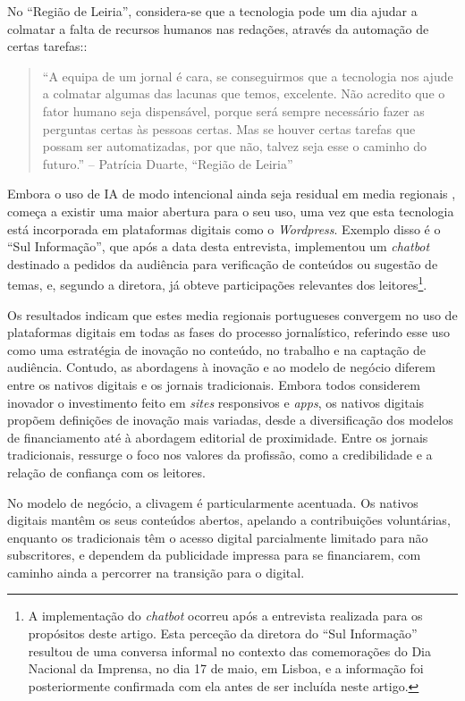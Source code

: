 \documentclass[portuguese]{textolivre}
\begin{document}
No ``Região de Leiria'', considera-se que a tecnologia pode um dia
ajudar a colmatar a falta de recursos humanos nas redações, através da
automação de certas tarefas::

\begin{quote}
``A equipa de um jornal é cara, se conseguirmos que a tecnologia nos
ajude a colmatar algumas das lacunas que temos, excelente. Não acredito
que o fator humano seja dispensável, porque será sempre necessário fazer
as perguntas certas às pessoas certas. Mas se houver certas tarefas que
possam ser automatizadas, por que não, talvez seja esse o caminho do
futuro.'' -- Patrícia Duarte, ``Região de Leiria''
\end{quote}

Embora o uso de IA de modo intencional ainda seja residual em media
regionais \cite{Goncalves2024}, começa a existir uma maior abertura
para o seu uso, uma vez que esta tecnologia está incorporada em
plataformas digitais como o \emph{Wordpress}. Exemplo disso é o ``Sul
Informação'', que após a data desta entrevista, implementou um
\emph{chatbot }destinado a pedidos da audiência para verificação de
conteúdos ou sugestão de temas, e, segundo a diretora, já obteve
participações relevantes dos leitores\footnote{A
  implementação do \emph{chatbot} ocorreu após a entrevista realizada
  para os propósitos deste artigo. Esta perceção da diretora do ``Sul
  Informação'' resultou de uma conversa informal no contexto das
  comemorações do Dia Nacional da Imprensa, no dia 17 de maio, em
  Lisboa, e a informação foi posteriormente confirmada com ela antes de
  ser incluída neste artigo.}.

Os resultados indicam que estes media regionais portugueses convergem no
uso de plataformas digitais em todas as fases do processo jornalístico,
referindo esse uso como uma estratégia de inovação no conteúdo, no
trabalho e na captação de audiência. Contudo, as abordagens à inovação e
ao modelo de negócio diferem entre os nativos digitais e os jornais
tradicionais. Embora todos considerem inovador o investimento feito em
\emph{sites} responsivos e \emph{apps}, os nativos digitais propõem
definições de inovação mais variadas, desde a diversificação dos modelos
de financiamento até à abordagem editorial de proximidade. Entre os
jornais tradicionais, ressurge o foco nos valores da profissão, como a
credibilidade e a relação de confiança com os leitores.

No modelo de negócio, a clivagem é particularmente acentuada. Os nativos
digitais mantêm os seus conteúdos abertos, apelando a contribuições
voluntárias, enquanto os tradicionais têm o acesso digital parcialmente
limitado para não subscritores, e dependem da publicidade impressa para
se financiarem, com caminho ainda a percorrer na transição para o
digital.
\end{document}
